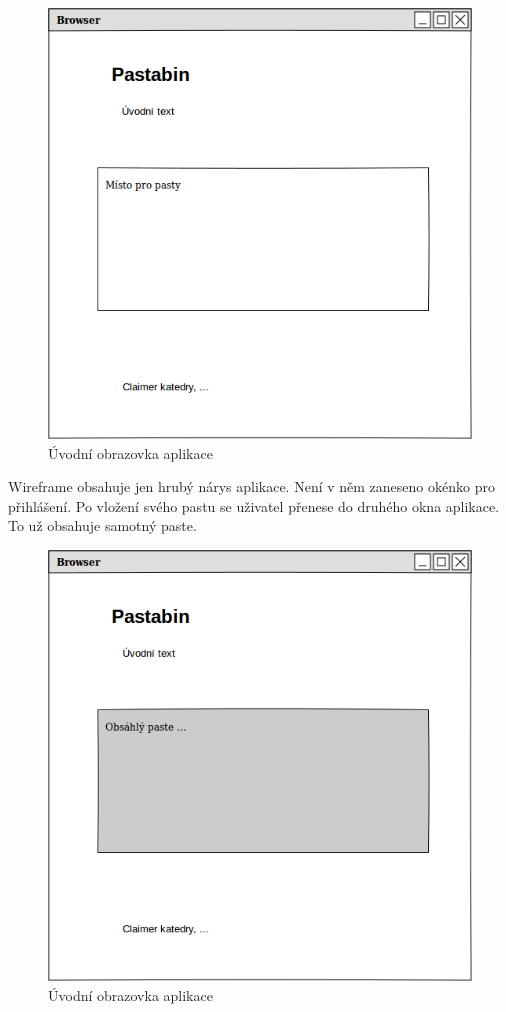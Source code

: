 \documentclass[a4paper,10pt]{report}
\begin{document}
\begin{figure}[H]
  \centering
	\includegraphics[scale=0.4]{uvod.png} 
  \caption{Úvodní obrazovka aplikace}
  \label{uvod_app}
\end{figure}

Wireframe obsahuje jen hrubý nárys aplikace. Není v něm zaneseno okénko pro přihlášení. Po vložení svého pastu se uživatel přenese do druhého okna aplikace. To už obsahuje samotný paste.

\begin{figure}[H]
  \centering
	\includegraphics[scale=0.4]{pasty.png} 
  \caption{Úvodní obrazovka aplikace}
  \label{paste_app}
\end{figure}
\end{document}
